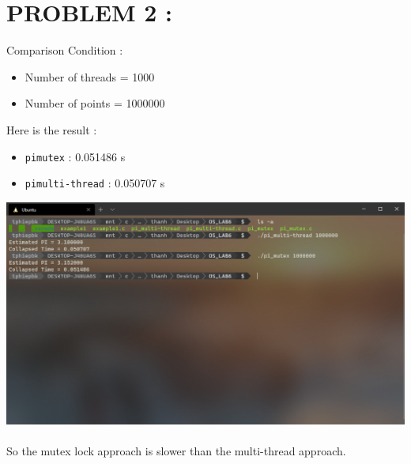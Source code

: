 \documentclass[a4paper]{article}
\begin{document}
\section{PROBLEM 2 :}
Comparison Condition :
\begin{itemize}
\item Number of threads = 1000
\item Number of points = 1000000
\end{itemize}
Here is the result :
\begin{itemize}
\item \texttt{pi\textunderscore mutex} : 0.051486 s
\item \texttt{pi\textunderscore multi-thread} : 0.050707 s
\end{itemize}
\includegraphics[scale=0.5]{compare.png} \\
\\
So the mutex lock approach is slower than the multi-thread approach.
\end{document}
